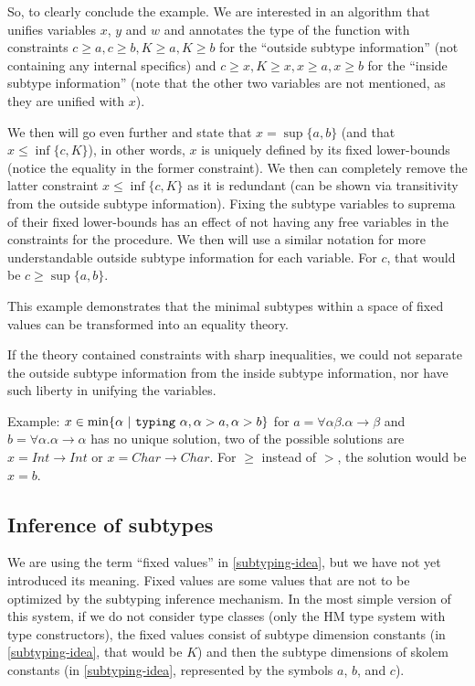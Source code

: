 So, to clearly conclude the example. We are interested in an algorithm that unifies variables $x$, $y$ and $w$ and annotates the type of the function with constraints $c \geq a, c \geq b, K \geq a, K \geq b$ for the ``outside subtype information'' (not containing any internal specifics) and $c \geq x, K \geq x, x \geq a, x \geq b$ for the ``inside subtype information'' (note that the other two variables are not mentioned, as they are unified with $x$).

We then will go even further and state that $x = \sup \{a, b\}$ (and that $x \leq \inf \{c, K\}$), in other words, $x$ is uniquely defined by its fixed lower-bounds (notice the equality in the former constraint). We then can completely remove the latter constraint $x \leq \inf \{c, K\}$ as it is redundant (can be shown via transitivity from the outside subtype information). Fixing the subtype variables to suprema of their fixed lower-bounds has an effect of not having any free variables in the constraints for the procedure. We then will use a similar notation for more understandable outside subtype information for each variable. For $c$, that would be $c \geq \sup \{a, b\}$.

This example demonstrates that the minimal subtypes within a space of fixed values can be transformed into an equality theory.

\begin{remark}
    If the theory contained constraints with sharp inequalities, we could not separate the outside subtype information from the inside subtype information, nor have such liberty in unifying the variables.

    Example: $x \in \min \{ \alpha \ |\  \mathtt{typing}\ \alpha, \alpha > a, \alpha > b \}$ for $a = \forall \alpha \beta . \alpha \to \beta$ and $b = \forall \alpha . \alpha \to \alpha$ has no unique solution, two of the possible solutions are $x = Int \to Int$ or $x = Char \to Char$. For $\geq$ instead of $>$, the solution would be $x = b$.
\end{remark}

\subsection{Inference of subtypes}

We are using the term ``fixed values'' in \cref{subtyping-idea}, but we have not yet introduced its meaning. Fixed values are some values that are not to be optimized by the subtyping inference mechanism. In the most simple version of this system, if we do not consider type classes (only the HM type system with type constructors), the fixed values consist of subtype dimension constants (in \cref{subtyping-idea}, that would be $K$) and then the subtype dimensions of skolem constants (in \cref{subtyping-idea}, represented by the symbols $a$, $b$, and $c$).

